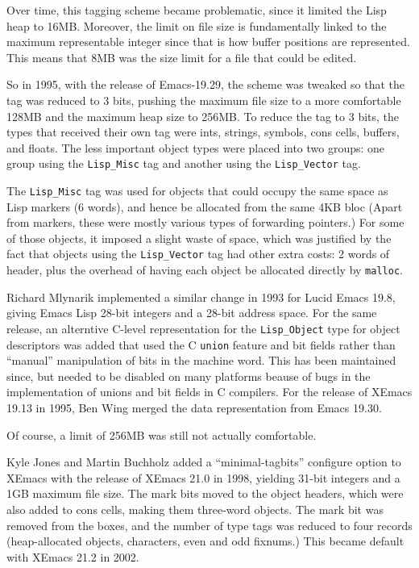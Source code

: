 \documentclass[format=acmsmall, review]{acmart}
\newcommand \Elisp {Emacs Lisp}
\begin{document}
Over time, this tagging scheme became problematic, since it limited the Lisp
heap to 16\;MB.
Moreover, the limit on file size is fundamentally linked to the maximum representable
integer since that is how buffer positions are represented.
This means that 8\;MB was the size limit for a file that could be edited.

So in 1995, with the release of Emacs-19.29,
the scheme was tweaked so that the tag was reduced to
3 bits, pushing the maximum file size to a more comfortable 128MB and the
maximum heap size to 256\;MB.  To reduce the tag to 3 bits,
the types that received their own tag were ints, strings, symbols, cons
cells, buffers, and floats.
The less important
object types were placed into two groups: one group using the
\texttt{Lisp\_Misc} tag and another using the \texttt{Lisp\_Vector}
tag.

The \texttt{Lisp\_Misc} tag was used for objects that could occupy
the same space as Lisp markers (6 words), and hence be allocated from the same
4KB bloc  (Apart from markers, these were mostly various types of
forwarding pointers.)  For some of those objects, it imposed a slight waste of space,
which was justified by the fact that objects using the \texttt{Lisp\_Vector}
tag had other extra costs: 2 words of header, plus the overhead of having
each object be allocated directly by \texttt{malloc}.

Richard Mlynarik implemented a similar change in 1993 for Lucid Emacs
19.8, giving \Elisp{} 28-bit integers and a 28-bit address space.  For
the same release, an alterntive C-level representation for the
\texttt{Lisp\_Object} type for object descriptors was added that used
the C \texttt{union} feature and bit fields rather than ``manual''
manipulation of bits in the machine word.  This has been maintained
since, but needed to be disabled on many platforms beause of bugs in
the implementation of unions and bit fields in C compilers.  For the
release of XEmacs 19.13 in 1995, Ben Wing merged the data
representation from Emacs 19.30.

Of course, a limit of 256\;MB was still not actually comfortable.

Kyle Jones and Martin Buchholz added a ``minimal-tagbits'' configure option to XEmacs with the release
of XEmacs 21.0 in 1998, yielding 31-bit integers and a 1GB maximum
file size.  The mark bits moved to the object headers, which were also
added to cons cells, making them three-word objects.
The mark bit was removed from the boxes, and the number of
type tags was reduced to four records (heap-allocated objects,
characters, even and odd fixnums.)  This became default with XEmacs
21.2 in 2002.
\end{document}
